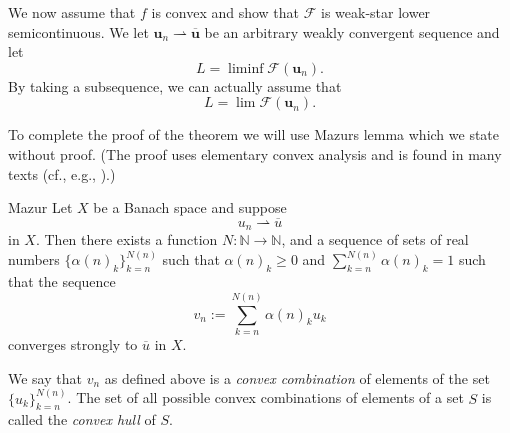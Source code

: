 We now assume that $f$ is convex and show that $\mathcal{F}$ is weak-star lower semicontinuous. We let $\bm{u}_n\rightharpoonup\overline{\bm{u}}$ be an arbitrary weakly convergent sequence and let
\begin{equation}\label{eq:tonelli-sufficiency-liminf-energy}
L=\liminf\mathcal{F}(\bm{u}_n).
\end{equation}
By taking a subsequence, we can actually assume that
\begin{equation}\label{eq:tonelli-sufficiency-subsequence-energy-limit}
L=\lim\mathcal{F}(\bm{u}_n).
\end{equation}


To complete the proof of the theorem we will use Mazur\textquotesingle s lemma which we state without proof. (The proof uses elementary convex analysis and is found in many texts (cf., e.g., \cite{ET}).)

\begin{Lemma}{Mazur}
\label{lem:mazur-strong-convex-combinations}
Let $X$ be a Banach space and suppose
\begin{equation}\label{eq:mazur-weakly-convergent-sequence}
u_n\rightharpoonup\overline u
\end{equation}
in $X$. Then there exists a function $N:\mathbb{N}\to\mathbb{N}$, and a sequence of sets of real numbers $\{\alpha(n)_k\}_{k=n}^{N(n)}$ such that $\alpha(n)_k\geq0$ and $\sum_{k=n}^{N(n)}\alpha(n)_k=1$ such that the sequence
\begin{equation}\label{eq:mazur-strongly-convergent-convex-combinations}
v_n:=\sum_{k=n}^{N(n)}\alpha(n)_ku_k
\end{equation}
converges strongly to $\overline u$ in $X$.
\end{Lemma}

\begin{Remark}
\label{rem:convex-combination-and-convex-hull}
We say that $v_n$ as defined above is a \emph{convex combination} of elements of the set $\{u_k\}_{k=n}^{N(n)}$. The set of all possible convex combinations of elements of a set $S$ is called the \emph{convex hull} of $S$.
\end{Remark}

